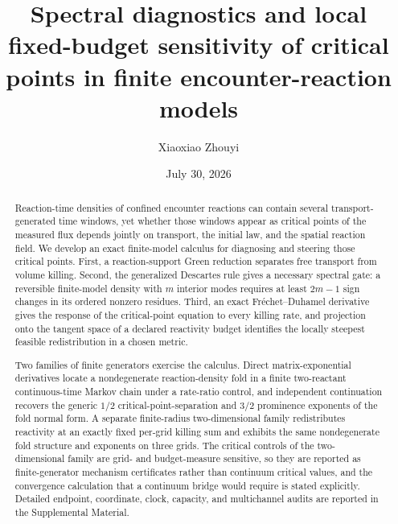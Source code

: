 \documentclass[aps,pre,reprint,amsmath,amssymb,longbibliography,floatfix]{revtex4-2}
\begin{document}
\title{Spectral diagnostics and local fixed-budget sensitivity of critical points in finite encounter-reaction models}

\author{Xiaoxiao Zhouyi}

\date{July 30, 2026}

\begin{abstract}
Reaction-time densities of confined encounter reactions can contain several
transport-generated time windows, yet whether those windows appear as
critical points of the measured flux depends jointly on transport, the
initial law, and the spatial reaction field. We develop an exact finite-model
calculus for diagnosing and steering those critical points. First, a
reaction-support Green reduction separates free transport from volume
killing. Second, the generalized Descartes rule gives a necessary spectral
gate: a reversible finite-model density with \(m\) interior modes requires at
least \(2m-1\) sign changes in its ordered nonzero residues. Third, an exact
Fr\'echet--Duhamel derivative gives the response of the critical-point
equation to every killing rate, and projection onto the tangent space of a
declared reactivity budget identifies the locally steepest feasible
redistribution in a chosen metric.

Two families of finite generators exercise the calculus. Direct
matrix-exponential derivatives locate a nondegenerate reaction-density fold
in a finite two-reactant continuous-time Markov chain under a rate-ratio
control, and independent continuation recovers the generic \(1/2\)
critical-point-separation and \(3/2\) prominence exponents of the fold
normal form. A separate finite-radius two-dimensional family redistributes
reactivity at an exactly fixed per-grid killing sum and exhibits the same
nondegenerate fold structure and exponents on three grids. The critical
controls of the two-dimensional family are grid- and budget-measure
sensitive, so they are reported as finite-generator mechanism certificates
rather than continuum critical values, and the convergence calculation that
a continuum bridge would require is stated explicitly. Detailed endpoint,
coordinate, clock, capacity, and multichannel audits are reported in the
Supplemental Material.
\end{abstract}

\maketitle
\end{document}
